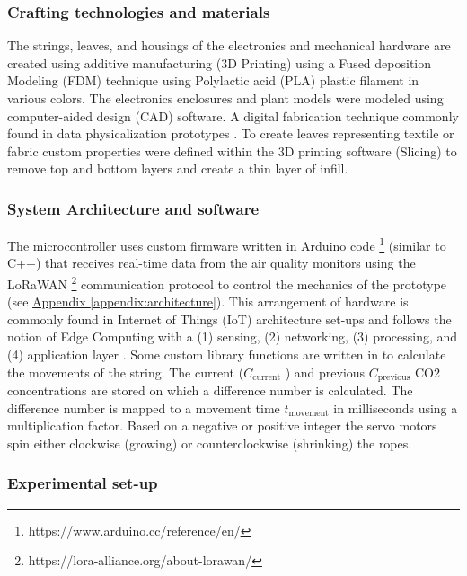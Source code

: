 \subsubsection{Crafting technologies and materials}
The strings, leaves, and housings of the electronics and mechanical hardware are created using additive manufacturing (3D Printing) using a Fused deposition Modeling (FDM) technique using Polylactic acid (PLA) plastic filament in various colors. The electronics enclosures and plant models were modeled using computer-aided design (CAD) software. A digital fabrication technique commonly found in data physicalization prototypes \cite{anhalt_university_germany_design_2022}. To create leaves representing textile or fabric custom properties were defined within the 3D printing software (Slicing) to remove top and bottom layers and create a thin layer of infill.

\subsubsection{System Architecture and software}

The microcontroller uses custom firmware written in Arduino code \footnote{https://www.arduino.cc/reference/en/} (similar to C++) that receives real-time data from the air quality monitors using the LoRaWAN \footnote{https://lora-alliance.org/about-lorawan/} communication protocol to control the mechanics of the prototype (see \hyperref[appendix:architecture]{Appendix \ref*{appendix:architecture}}). This arrangement of hardware is commonly found in Internet of Things (IoT) architecture set-ups and follows the notion of Edge Computing with a (1) sensing, (2) networking, (3) processing, and (4) application layer \cite{li_edge-oriented_2019, idrees_edge_2018}. Some custom library functions are written in to calculate the movements of the string. The current (\( C_{\text{current}} \) ) and previous \( C_{\text{previous}} \) CO2 concentrations are stored on which a difference number is calculated. The difference number is mapped to a movement time \( t_{\text{movement}} \) in milliseconds using a multiplication factor. Based on a negative or positive integer the servo motors spin either clockwise (growing) or counterclockwise (shrinking) the ropes.

\subsubsection{Experimental set-up}

